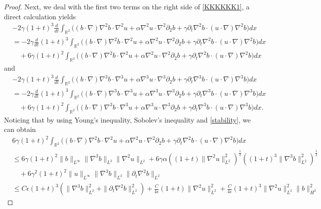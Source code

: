 \documentclass[reqno,11pt]{amsart}
\def\R{\mathbb R}
\numberwithin{Thm}{section}
\begin{document}
\begin{proof}
Next, we deal with the first two terms on the right side of \eqref{KKKKKK1}, a direct calculation yields
\begin{align}\label{T1}
&-2\gamma(1+t)^3\frac{d}{dt}\int_{\R^2}\big((b\cdot\nabla)\nabla^2 b\cdot\nabla^2 u+\alpha\nabla^2 u\cdot\nabla^2\partial_2b+\gamma\partial_{t}\nabla^2 b\cdot (u\cdot\nabla)\nabla^2 b\big)dx\nonumber\\
&=-2\gamma\frac{d}{dt}(1+t)^3\int_{\R^2}\big((b\cdot\nabla)\nabla^2 b\cdot\nabla^2 u+\alpha\nabla^2 u\cdot\nabla^2\partial_2 b+\gamma\partial_{t}\nabla^2 b\cdot (u\cdot\nabla)\nabla^2 b\big)dx\nonumber\\
 &\quad+6\gamma(1+t)^2\int_{\R^2}\big((b\cdot\nabla)\nabla^2 b\cdot\nabla^2 u+\alpha\nabla^2 u\cdot\nabla^2\partial_2b+\gamma\partial_{t}\nabla^2 b\cdot (u\cdot\nabla)\nabla^2 b\big)dx
\end{align}
and
\begin{align}\label{T2}
&-2\gamma(1+t)^3\frac{d}{dt}\int_{\R^2}\big((b\cdot\nabla)\nabla^3 b\cdot\nabla^3 u+\alpha\nabla^3 u\cdot\nabla^3\partial_2 b+\gamma\partial_{t}\nabla^3 b\cdot (u\cdot\nabla)\nabla^3 b\big)dx\nonumber\\
&=-2\gamma\frac{d}{dt}(1+t)^3\int_{\R^2}\big((b\cdot\nabla)\nabla^3 b\cdot\nabla^3 u+\alpha\nabla^3 u\cdot\nabla^3\partial_2 b+\gamma\partial_{t}\nabla^3 b\cdot (u\cdot\nabla)\nabla^3 b\big)dx\nonumber\\
 &\quad+6\gamma(1+t)^2\int_{\R^2}\big((b\cdot\nabla)\nabla^3 b\cdot\nabla^3 u+\alpha\nabla^3 u\cdot\nabla^3\partial_2b+\gamma\partial_{t}\nabla^3 b\cdot (u\cdot\nabla)\nabla^3 b\big)dx.
\end{align}
Noticing that by using Young's inequality, Sobolev's inequality and \eqref{stability}, we can obtain
\begin{align}\label{T3}
&6\gamma(1+t)^2\int_{\R^2}\big((b\cdot\nabla)\nabla^2 b\cdot\nabla^2 u+\alpha\nabla^2 u\cdot\nabla^2\partial_2 b+\gamma\partial_{t}\nabla^2 b\cdot (u\cdot\nabla)\nabla^2 b\big)dx\nonumber\\
&\leq6\gamma(1+t)^2\|b\|_{L^\infty}\|\nabla^3 b\|_{L^2}\|\nabla^2 u\|_{L^2} +6\gamma\alpha\left((1+t)\|\nabla^2 u\|_{L^2}^2\right)^{\frac{1}{2}}\left((1+t)^3\|\nabla^3 b\|_{L^2}^2\right)^{\frac{1}{2}}\nonumber\\
&\quad+6\gamma^2(1+t)^2\|u\|_{L^\infty}\|\nabla^3 b\|_{L^2}\|\partial_t\nabla^2 b\|_{L^2} \nonumber\\
&\leq C\epsilon(1+t)^3(\|\nabla^3 b\|_{L^2}^2+\|\partial_t\nabla^2 b\|_{L^2}^2) +\frac{C}{4\epsilon}(1+t)\|\nabla^2u\|_{L^2}^2+\frac{C}{4\epsilon}(1+t)^3\|\nabla^2 u\|_{L^2}^2\|b\|_{H^2}^2

\end{align}
\end{proof}
\end{document}
